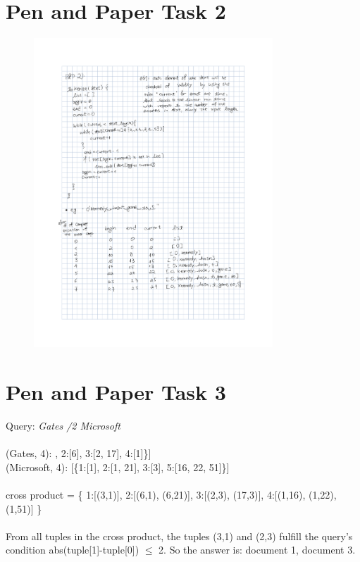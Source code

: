\documentclass[a4paper]{scrartcl}
\begin{document}
\section*{Pen and Paper Task 2}
\begin{figure}[ht]
    \includegraphics[width=0.8\textwidth]{img/p&p2.pdf}
\end{figure}


\clearpage
\section*{Pen and Paper Task 3}
Query: \textit{Gates /2 Microsoft}\\
\\
(Gates, 4): \quad \; [\{1:[3], 2:[6], 3:[2, 17], 4:[1]\}]\\
(Microsoft, 4): [\{1:[1], 2:[1, 21], 3:[3], 5:[16, 22, 51]\}]\\
\\
cross product = \{
  1:[(3,1)],
  2:[(6,1), (6,21)],
  3:[(2,3), (17,3)],
  4:[(1,16), (1,22), (1,51)]
\}\\
\\
From all tuples in the cross product, the tuples (3,1) and (2,3) fulfill the query's condition abs(tuple[1]-tuple[0]) $\leq$ 2. So the answer is: document 1, document 3.\\
\end{document}
